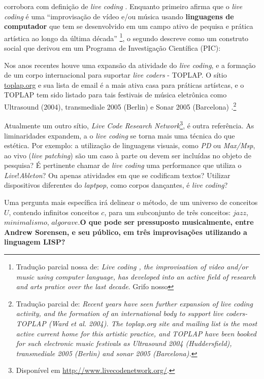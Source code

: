  corrobora com definição de \emph{live coding}  . Enquanto primeiro afirma que o \emph{live coding} é uma  ``improvisação de vídeo e/ou música usando \textbf{linguagens de computador} que tem se desenvolvido em um campo ativo de pequisa e prática artística ao longo da última década'' \footnote{Tradução parcial nossa de: \emph{Live coding , the improvisation of video and/or music using computer language, has developed into an active field of research and arts pratice over the last decade}. Grifo nosso}, o segundo descreve como um construto social que derivou em um Programa de Investigação Científica (PIC):

\begin{citacao} 
Nos anos recentes houve uma expansão da atividade do \emph{live coding}, e a formação de um corpo internacional para suportar \emph{live coders} - TOPLAP. O sítio \url{toplap.org} e sua lista de email é a mais ativa casa para práticas artístcas, e o TOPLAP tem sido listado para tais festivais de música eletrônica como Ultrasound (2004), transmediale 2005 (Berlin) e Sonar 2005 (Barcelona) \cite[p.~3-4]{blackwell_programming_2005}.\footnote{Tradução parcial de: \emph{Recent years have seen further expansion of live coding activity, and the formation of an international body to support live coders- TOPLAP (Ward et al. 2004). The toplap.org site and mailing list is the most active current home for this artistic practice, and TOPLAP have been booked for such electronic music festivals as Ultrasound 2004 (Huddersfield), transmediale 2005 (Berlin) and sonar 2005 (Barcelona).}}
\end{citacao}

Atualmente um outro sítio, \emph{Live Code Research Network}\footnote{Disponível em \url{http://www.livecodenetwork.org/}.}, é outra referência. As liminaridades expandem, a o \emph{live coding} se torna mais uma técnica do que estética. Por exemplo: a utilização de linguagens visuais, como \emph{PD} ou \emph{Max/Msp}, ao vivo (\emph{live patching}) são um caso à parte ou devem ser incluídas no objeto de pesquisa? É pertinente chamar de \emph{live coding} uma performance que utiliza o \emph{Live}!\emph{Ableton}? Ou apenas atividades em que se codificam textos? Utilizar dispositivos diferentes do \emph{laptpop}, como corpos dançantes, é \emph{live coding}? 

Uma pergunta mais específica irá delinear o método, de um universo de conceitos $U$, contendo infinitos conceitos $c$, para um subconjunto de três conceitos: $jazz$, $minimalismo$, $algorave$.\textbf{O que pode ser pressuposto musicalmente, entre Andrew Sorensen, e seu público, em três improvisações utilizando a linguagem LISP?} 

